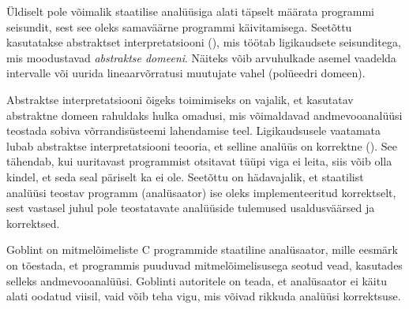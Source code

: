 \documentclass[../thesis.tex]{subfiles}
\begin{document}
Üldiselt pole võimalik staatilise analüüsiga alati täpselt määrata programmi seisundit, sest see oleks samaväärne programmi käivitamisega.
Seetõttu kasutatakse abstraktset interpretatsiooni (), mis töötab ligikaudsete seisunditega, mis moodustavad \emph{abstraktse domeeni}. Näiteks võib arvuhulkade asemel vaadelda intervalle või uurida lineaarvõrratusi muutujate vahel (polüeedri domeen).

Abstraktse interpretatsiooni õigeks toimimiseks on vajalik, et kasutatav abstraktne domeen rahuldaks hulka omadusi, mis võimaldavad andmevooanalüüsi teostada sobiva võrrandisüsteemi lahendamise teel.
Ligikaudsusele vaatamata lubab abstraktse interpretatsiooni teooria, et selline analüüs on korrektne (). See tähendab, kui uuritavast programmist otsitavat tüüpi viga ei leita, siis võib olla kindel, et seda seal päriselt ka ei ole.
Seetõttu on hädavajalik, et staatilist analüüsi teostav programm (analüsaator) ise oleks implementeeritud korrektselt, sest vastasel juhul pole teostatavate analüüside tulemused usaldusväärsed ja korrektsed.

\begin{comment}
Seetõttu vaadeldakse ligikaudseid seisundeid, mille uurimist nimetatakse abstraktseks interpretatsiooniks (\ingl{abstract interpretation}) ja see põhineb rangel teoreetilisel alusel, millel on ligikaudsusele vaatamata head omadused. Nimelt, abstraktse interpretatsiooni teooria lubab, et analüüs on korrektne (\ingl{sound}), st kui uuritavast programmist otsitavat tüüpi viga ei leita, siis võib olla kindel, et seda seal päriselt ka ei ole.

Ligikaudsed seisundid, mis vastavad konkreetsetele seisunditele, moodustavad \emph{abstraktse domeeni}. Näiteks võib arvuhulkade asemel vaadelda intervalle või uurida lineaarseid piire muutujate vahel (polüeedri domeen). Abstraktse interpretatsiooni õigeks toimimiseks on vajalik, et abstraktne domeen rahuldaks hulka omadusi, mis võimaldavad andmevooanalüüsi teostada sobiva võrrandisüsteemi lahendamise teel. Seetõttu on hädavajalik, et staatilist analüüsi teostav programm (analüsaator) ise oleks implementeeritud korrektselt, sest vastasel juhul pole teostatavate analüüside tulemused usaldusväärsed ja korrektsed.
\end{comment}

Goblint on mitmelõimeliste C programmide staatiline analüsaator, mille eesmärk on tõestada, et programmis puuduvad mitmelõimelisusega seotud vead, kasutades selleks andmevooanalüüsi. Goblinti autoritele on teada, et analüsaator ei käitu alati oodatud viisil, vaid võib teha vigu, mis võivad rikkuda analüüsi korrektsuse.
\end{document}
